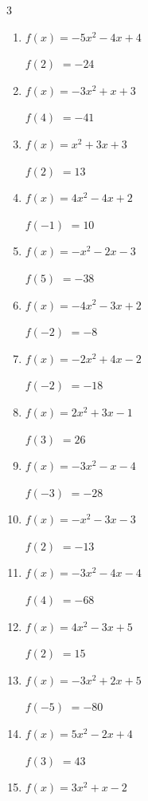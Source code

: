 \begin{multicols}{3}
\begin{enumerate}
$f(-5)$
        $= 149$

\columnbreak %

  \item $f(x)=-5x^{2}-4x+4$

$f(2)$
        $= -24$

  \item $f(x)=-3x^{2}+x+3$

$f(4)$
        $= -41$

  \item $f(x)=x^{2}+3x+3$

$f(2)$
        $= 13$

  \item $f(x)=4x^{2}-4x+2$

$f(-1)$
        $= 10$

  \item $f(x)=-x^{2}-2x-3$

$f(5)$
        $= -38$

  \item $f(x)=-4x^{2}-3x+2$

$f(-2)$
        $= -8$

  \item $f(x)=-2x^{2}+4x-2$

$f(-2)$
        $= -18$

  \item $f(x)=2x^{2}+3x-1$

$f(3)$
        $= 26$

  \item $f(x)=-3x^{2}-x-4$

$f(-3)$
        $= -28$

  \item $f(x)=-x^{2}-3x-3$

$f(2)$
        $= -13$

  \item $f(x)=-3x^{2}-4x-4$

$f(4)$
        $= -68$

  \item $f(x)=4x^{2}-3x+5$

$f(2)$
        $= 15$

  \item $f(x)=-3x^{2}+2x+5$

$f(-5)$
        $= -80$

  \item $f(x)=5x^{2}-2x+4$

$f(3)$
        $= 43$

  \item $f(x)=3x^{2}+x-2$


\end{enumerate}
\end{multicols}
